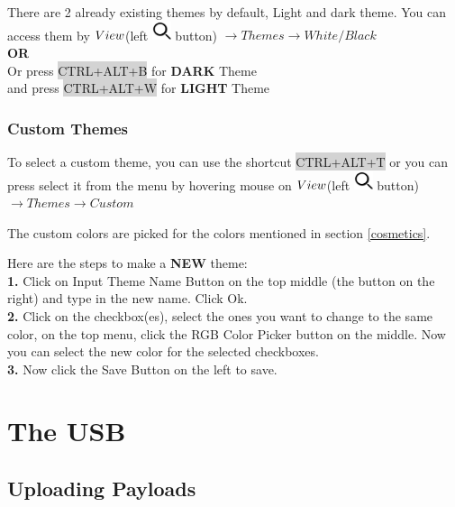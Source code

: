 \documentclass[a4paper,12pt]{article}
\begin{document}
There are 2 already existing themes by default, Light and dark theme. You can access them by $\\View$(left \includegraphics[width=5.5mm]{pictures/white_bk/view.png} button) $\rightarrow Themes \rightarrow White/Black$
\large
\ \\
\textbf{OR}
\ \\
\normalsize
Or press \colorbox{lightgray}{CTRL+ALT+B} for \textbf{DARK} Theme\\
and press \colorbox{lightgray}{CTRL+ALT+W} for \textbf{LIGHT} Theme

\subsubsection{Custom Themes}

To select a custom theme, you can use the shortcut \colorbox{lightgray}{CTRL+ALT+T} \medskip or you can press select it from the menu by hovering mouse on
$\\View$(left \includegraphics[width=5.5mm]{pictures/white_bk/view.png} button) $\rightarrow Themes \rightarrow Custom$

The custom colors are picked for the colors mentioned in section \ref{cosmetics}.

Here are the steps to make a \textbf{NEW} theme:\\
\textbf{1.} Click on \colorbox{WhiteSmoke!70!Lavender}{Input Theme Name} Button on the top middle (the button on the right) and type in the new name. Click \colorbox{WhiteSmoke!70!Lavender}{Ok}.\\
\textbf{2.} Click on the checkbox(es), select the ones you want to change to the same color, on the top menu, click the \colorbox{WhiteSmoke!70!Lavender}{RGB Color Picker} button on the middle. Now you can select the new color for the selected checkboxes.\\
\textbf{3.} Now click the \colorbox{WhiteSmoke!70!Lavender}{Save} Button on the left to save.\\

\section{The USB}

\subsection{Uploading Payloads}\label{upload_payloads}
\end{document}
